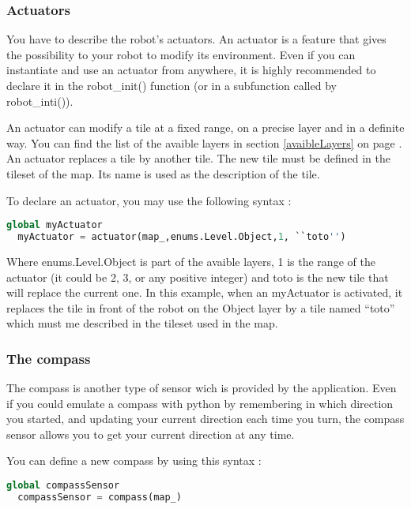\documentclass[a4paper,11pt]{article}
\begin{document}
\subsubsection{Actuators}

You have to describe the robot's actuators. An actuator is a feature
that gives the possibility to your robot to modify its
environment. Even if you can instantiate and use an actuator from
anywhere, it is highly recommended to declare it in the robot\_init()
function (or in a subfunction called by robot\_inti()).

An actuator can modify a tile at a fixed range, on a precise layer and
in a definite way. You can find the list of the avaible layers in
section \ref{avaibleLayers} on page \pageref{avaibleLayers}. An actuator replaces a tile by another
tile. The new tile must be defined in the tileset of the map. Its name
is used as the description of the tile.

To declare an actuator, you may use the following syntax :

\begin{lstlisting}[language=Python]
  global myActuator
  myActuator = actuator(map_,enums.Level.Object,1, ``toto'')
\end{lstlisting}

Where enums.Level.Object is part of the avaible layers, 1 is the range
of the actuator (it could be 2, 3, or any positive integer) and toto
is the new tile that will replace the current one. In this example,
when an myActuator is activated, it replaces the tile in front of the
robot on the Object layer by a tile named ``toto'' which must me
described in the tileset used in the map.


\subsubsection{The compass}

The compass is another type of sensor wich is provided by the
application. Even if you could emulate a compass with python by
remembering in which direction you started, and updating your current
direction each time you turn, the compass sensor allows you to get
your current direction at any time.

You can define a new compass by using this syntax :

\begin{lstlisting}[language=Python]
  global compassSensor
  compassSensor = compass(map_)
\end{lstlisting}
\end{document}
